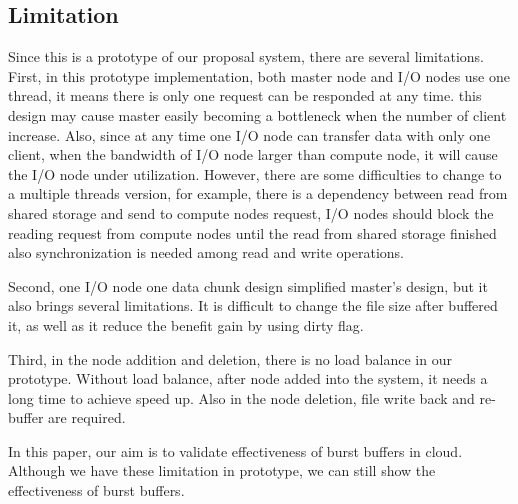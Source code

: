 \subsection{Limitation}

Since this is a prototype of our proposal system, there are several limitations.
First, in this prototype implementation, both master node and I/O nodes use one thread, it means
there is only one request can be responded at any time.
this design may cause master easily becoming a bottleneck when the number of client increase.
Also, since at any time one I/O node can transfer data with only one client, when the bandwidth of
I/O node larger than compute node, it will cause the I/O node under utilization.
However, there are some difficulties to change to a multiple threads version, for example, there
is a dependency between read from shared storage and send to compute nodes request, I/O nodes should
block the reading request from compute nodes until the read from shared storage finished also
synchronization is needed among read and write operations.

Second, one I/O node one data chunk design simplified master's design, but it also brings several
limitations. It is difficult to change the file size after buffered it, as well as it reduce the
benefit gain by using dirty flag.

Third, in the node addition and deletion, there is no load balance in our prototype.
Without load balance, after node added into the system, it needs a long time to achieve speed up.
Also in the node deletion, file write back and re-buffer are required.

In this paper, our aim is to validate effectiveness of burst buffers in
cloud.
Although we have these limitation in prototype, we can still show the effectiveness of burst
buffers.
